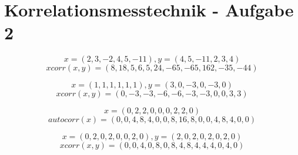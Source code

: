 \documentclass[10pt,a4paper]{article}
\begin{document}
\section*{Korrelationsmesstechnik - Aufgabe 2}

\[ x = (2,3,-2,4,5,-11), y = (4,5,-11,2,3,4) \]
\[ xcorr(x, y) = (8,18,5,6,5,24,-65,-65,162,-35,-44)\]

\[ x = (1,1,1,1,1,1), y = (3,0,-3,0,-3,0) \]
\[ xcorr(x, y) = (0, -3, -3, -6, -6, -3, -3, 0, 0, 3, 3)\]

\[ x = (0, 2, 2, 0, 0, 0, 2, 2, 0) \]
\[ autocorr(x) = (0,0,4,8,4,0,0,8,16,8,0,0,4,8,4,0,0) \]

\[ x = (0, 2, 0, 2, 0, 0, 2, 0), y = (2, 0, 2, 0, 2, 0, 2, 0) \]
\[ xcorr(x, y) = (0,0,4,0,8,0,8,4,8,4,4,4,0,4,0) \]
\end{document}
